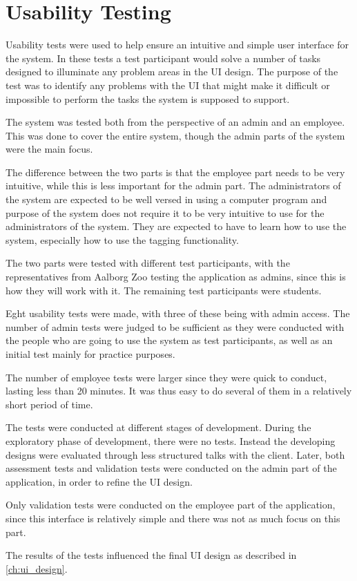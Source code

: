 \section{Usability Testing}\label{sc:UsabilityTesting}
Usability tests were used to help ensure an intuitive and simple user interface for the system. In these tests a test participant would solve a number of tasks designed to illuminate any problem areas in the UI design. The purpose of the test was to identify any problems with the UI that might make it difficult or impossible to perform the tasks the system is supposed to support.
\par
The system was tested both from the perspective of an admin and an employee. This was done to cover the entire system, though the admin parts of the system were the main focus. 
\par
The difference between the two parts is that the employee part needs to be very intuitive, while this is less important for the admin part. The administrators of the system are expected to be well versed in using a computer program and purpose of the system does not require it to be very intuitive to use for the administrators of the system. They are expected to have to learn how to use the system, especially how to use the tagging functionality. 
\par
The two parts were tested with different test participants, with the representatives from Aalborg Zoo testing the application as admins, since this is how they will work with it. The remaining test participants were students.
\par
{}
Eght usability tests were made, with three of these being with admin access. The number of admin tests were judged to be sufficient as they were conducted with the people who are going to use the system as test participants, as well as an initial test mainly for practice purposes. 
\par
The number of employee tests were larger since they were quick to conduct, lasting less than 20 minutes. It was thus easy to do several of them in a relatively short period of time. 
\par
The tests were conducted at different stages of development. During the exploratory phase of development, there were no tests. Instead the developing designs were evaluated through less structured talks with the client. Later, both assessment tests and validation tests were conducted on the admin part of the application, in order to refine the UI design. 
\par
Only validation tests were conducted on the employee part of the application, since this interface is relatively simple and there was not as much focus on this part. 
\par
The results of the tests influenced the final UI design as described in \autoref{ch:ui_design}.

